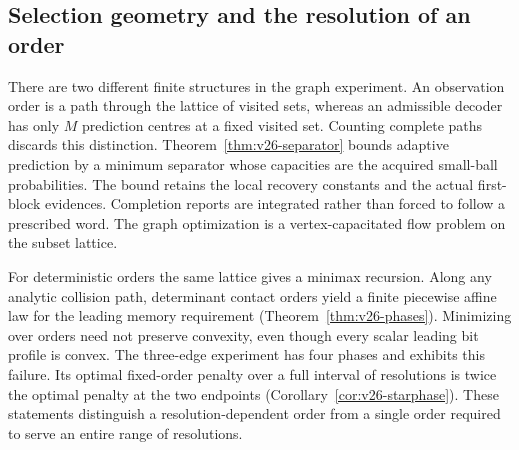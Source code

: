\subsection{Selection geometry and the resolution of an order}
There are two different finite structures in the graph experiment.
An observation order is a path through the lattice of visited sets,
whereas an admissible decoder has only $M$ prediction centres at a
fixed visited set. Counting complete paths discards this distinction.
Theorem~\ref{thm:v26-separator} bounds adaptive prediction by a minimum
separator whose capacities are the acquired small-ball probabilities.
The bound retains the local recovery constants and the actual
first-block evidences. Completion reports are integrated rather than
forced to follow a prescribed word. The graph optimization is a
vertex-capacitated flow problem on the subset lattice.

For deterministic orders the same lattice gives a minimax recursion.
Along any analytic collision path, determinant contact orders yield a
finite piecewise affine law for the leading memory requirement
(Theorem~\ref{thm:v26-phases}). Minimizing over orders need not preserve
convexity, even though every scalar leading bit profile is convex.
The three-edge experiment has four phases and exhibits this failure.
Its optimal fixed-order penalty over a full interval of resolutions
is twice the optimal penalty at the two endpoints
(Corollary~\ref{cor:v26-starphase}). These statements distinguish a
resolution-dependent order from a single order required to serve an
entire range of resolutions.
